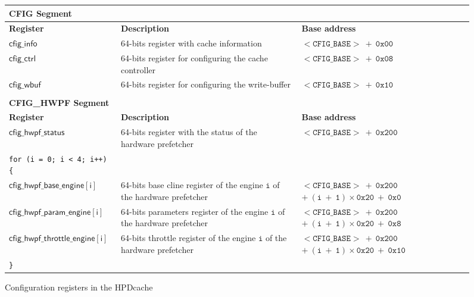 \documentclass[10pt,titlepage,twoside]{book}
\begin{document}
\begin{figure}[!htbp]
  \begin{center}
    \caption{Configuration registers in the \ac*{HPDcache}}%
    {\small%
    \begin{tabular}{p{}p{}p{}}
      \textbf{CFIG Segment} & &\\
      \toprule
      \textbf{Register}
      & \textbf{Description}
      & \textbf{Base address} \\
      \toprule
      $\mathsf{cfig\_info}$
      & 64-bits register with cache information
      & $\mathtt{<CFIG\_BASE>~+~0x00}$\\
      \midrule
      $\mathsf{cfig\_ctrl}$
      & 64-bits register for configuring the cache controller
      & $\mathtt{<CFIG\_BASE>~+~0x08}$\\
      \midrule
      $\mathsf{cfig\_wbuf}$
      & 64-bits register for configuring the write-buffer
      & $\mathtt{<CFIG\_BASE>~+~0x10}$\\
      & & \\
      \textbf{CFIG\_HWPF Segment} & &\\
      \toprule
      \textbf{Register}
      & \textbf{Description}
      & \textbf{Base address} \\
      \toprule
      $\mathsf{cfig\_hwpf\_status}$
      & 64-bits register with the status of the hardware prefetcher
      & $\mathtt{<CFIG\_BASE>~+~0x200}$\\
      \midrule
      \verb$for (i = 0; i < 4; i++) {$ & & \\
      \midrule
      $\mathsf{cfig\_hwpf\_base\_engine[i]}$
      & 64-bits base cline register of the engine $\mathtt{i}$ of the hardware prefetcher
      & $\mathtt{<CFIG\_BASE>~+~0x200}$
        $\mathtt{+~(i~+~1)\times{}0x20~+~0x0}$\\
      \midrule
      $\mathsf{cfig\_hwpf\_param\_engine[i]}$
      & 64-bits parameters register of the engine $\mathtt{i}$ of the hardware prefetcher
      & $\mathtt{<CFIG\_BASE>~+~0x200}$
        $\mathtt{+~(i~+~1)\times{}0x20~+~0x8}$\\
      \midrule
      $\mathsf{cfig\_hwpf\_throttle\_engine[i]}$
      & 64-bits throttle register of the engine $\mathtt{i}$ of the hardware prefetcher
      & $\mathtt{<CFIG\_BASE>~+~0x200}$
        $\mathtt{+~(i~+~1)\times{}0x20~+~0x10}$\\
      \midrule
      \verb$}$ & & \\
      \bottomrule
    \end{tabular}}
  \end{center}
\end{figure}
\end{document}
